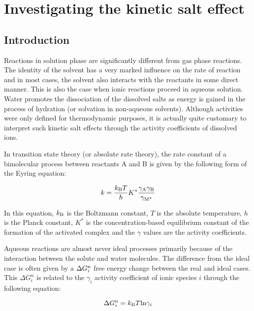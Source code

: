 \fancyhead[LO,RE]{\thesection}
\fancyfoot[LE,RO]{\thepage}

\section{Investigating the kinetic salt effect}
\subsection{Introduction}

Reactions in solution phase are significantly different from gas phase reactions. The identity of the solvent has a very marked influence on the rate of reaction and in most cases, the solvent also interacts with the reactants in some direct manner. This is also the case when ionic reactions proceed in aqueous solution. Water promotes the dissociation of the dissolved salts as energy is gained in the process of hydration (or solvation in non-aqueous solvents). Although activities were only defined for thermodynamic purposes, it is actually quite customary to interpret such kinetic salt effects through the activity coefficients of dissolved ions.

In transition state theory (or absolute rate theory), the rate constant of a bimolecular process between reactants A and B is given by the following form of the Eyring equation:

\begin{equation}
k = \frac{k_{\text B} T}{h} K^* \frac{\gamma_{\text A} \gamma_{\text B}}{\gamma_{\text{M*}}}
\end{equation}

In this equation, $k_{\text B}$ is the Boltzmann constant, $T$ is the absolute temperature, $h$ is the Planck constant, $K^*$ is the concentration-based equilibrium constant of the formation of the activated complex and the $\gamma$ values are the activity coefficients.

Aqueous reactions are almost never ideal processes primarily because of the interaction between the solute and water molecules. The difference from the ideal case is often given by a $\Delta G_i^{\text n}$ free energy change between the real and ideal cases. This $\Delta G_i^n$ is related to the $\gamma_i$ activity coefficient of ionic species $i$ through the following equation:

\begin{equation}
\Delta G_i^{\text n} = k_{\text B} T \text {ln} \gamma_i
\end{equation}

